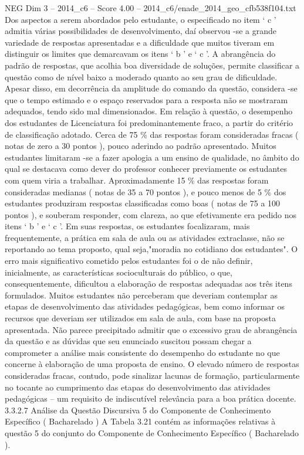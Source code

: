 \begin{textsample}{NEG Dim 3 – 2014\_c6 – Score 4.00 – 2014\_c6/enade\_2014\_geo\_cfb538f104.txt}
Dos aspectos a serem abordados pelo estudante, o especificado no item ‘ c ’ admitia várias possibilidades de desenvolvimento, daí observou -se a grande variedade de respostas apresentadas e a dificuldade que muitos tiveram em distinguir os limites que demarcavam os itens ‘ b ’ e ‘ c ’.
A abrangência do padrão de respostas, que acolhia boa diversidade de soluções, permite classificar a questão como de nível baixo a moderado quanto ao seu grau de dificuldade.
Apesar disso, em decorrência da amplitude do comando da questão, considera -se que o tempo estimado e o espaço reservados para a resposta não se mostraram adequados, tendo sido mal dimensionados.
Em relação à questão, o desempenho dos estudantes de Licenciatura foi predominantemente fraco, a partir do critério de classificação adotado.
Cerca de 75 \% das respostas foram consideradas fracas ( notas de zero a 30 pontos ), pouco aderindo ao padrão apresentado.
Muitos estudantes limitaram -se a fazer apologia a um ensino de qualidade, no âmbito do qual se destacava como dever do professor conhecer previamente os estudantes com quem viria a trabalhar.
Aproximadamente 15 \% das respostas foram consideradas medianas ( notas de 35 a 70 pontos ), e pouco menos de 5 \% dos estudantes produziram respostas classificadas como boas ( notas de 75 a 100 pontos ), e souberam responder, com clareza, ao que efetivamente era pedido nos itens ‘ b ’ e ‘ c ’.
Em suas respostas, os estudantes focalizaram, mais frequentemente, a prática em sala de aula ou as atividades extraclasse, não se reportando ao tema proposto, qual seja,"moradia no cotidiano dos estudantes".
O erro mais significativo cometido pelos estudantes foi o de não definir, inicialmente, as características socioculturais do público, o que, consequentemente, dificultou a elaboração de respostas adequadas aos três itens formulados.
Muitos estudantes não perceberam que deveriam contemplar as etapas de desenvolvimento das atividades pedagógicas, bem como informar os recursos que deveriam ser utilizados em sala de aula, com base na proposta apresentada.
Não parece precipitado admitir que o excessivo grau de abrangência da questão e as dúvidas que seu enunciado suscitou possam chegar a comprometer a análise mais consistente do desempenho do estudante no que concerne à elaboração de uma proposta de ensino.
O elevado número de respostas consideradas fracas, contudo, pode sinalizar lacunas de formação, particularmente no tocante ao cumprimento das etapas do desenvolvimento das atividades pedagógicas – um requisito de indiscutível relevância para a boa prática docente. 3.3.2.7 Análise da Questão Discursiva 5 do Componente de Conhecimento Específico ( Bacharelado ) A Tabela 3.21 contém as informações relativas à questão 5 do conjunto do Componente de Conhecimento Específico ( Bacharelado ).

\end{textsample}
